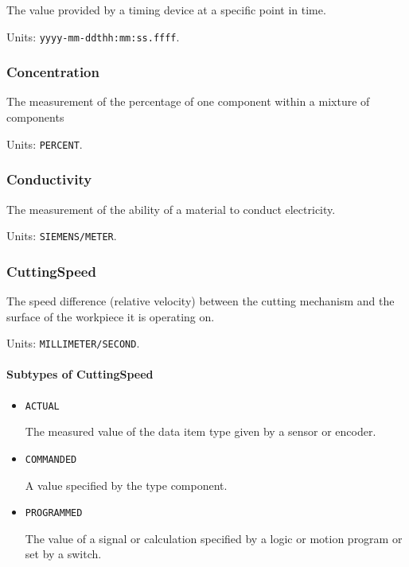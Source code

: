 The value provided by a timing device at a specific point in time.


Units: \texttt{yyyy-mm-ddthh:mm:ss.ffff}.

\subsubsection{Concentration}
\label{sec:Concentration}



The measurement of the percentage of one component within a mixture of components


Units: \texttt{PERCENT}.

\subsubsection{Conductivity}
\label{sec:Conductivity}



The measurement of the ability of a material to conduct electricity.


Units: \texttt{SIEMENS/METER}.

\subsubsection{CuttingSpeed}
\label{sec:CuttingSpeed}



The speed difference (relative velocity) between the cutting mechanism and the surface of the workpiece it is operating on.


Units: \texttt{MILLIMETER/SECOND}.

\paragraph{Subtypes of CuttingSpeed}\mbox{}
\label{sec:Subtypes of CuttingSpeed}

\begin{itemize}

\item \texttt{ACTUAL}


The measured value of the data item type given by a sensor or encoder.

\item \texttt{COMMANDED}


A value specified by the  type component.

\item \texttt{PROGRAMMED}


The value of a signal or calculation specified by a logic or motion program or set by a switch.


\end{itemize}

